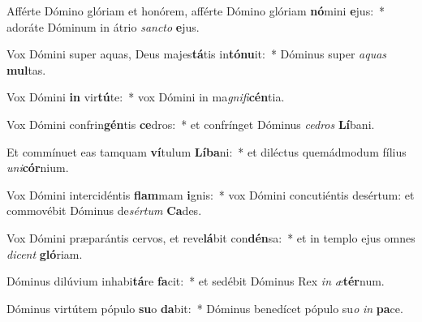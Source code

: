 \item Afférte Dómino glóriam et honórem, afférte Dómino glóriam \textbf{nó}mini \textbf{e}jus:~* adoráte Dóminum in átrio \textit{sanc}\textit{to} \textbf{e}jus.
\item Vox Dómini super aquas, Deus majes\textbf{tá}tis in\textbf{tó}\textbf{nu}it:~* Dóminus super \textit{a}\textit{quas} \textbf{mul}tas.
\item Vox Dómini \textbf{in} vir\textbf{tú}te:~* vox Dómini in ma\textit{gni}\textit{fi}\textbf{cén}tia.
\item Vox Dómini confrin\textbf{gén}tis \textbf{ce}dros:~* et confrínget Dóminus \textit{ce}\textit{dros} \textbf{Lí}bani.
\item Et commínuet eas tamquam \textbf{ví}tulum \textbf{Lí}\textbf{ba}ni:~* et diléctus quemádmodum fílius \textit{u}\textit{ni}\textbf{cór}nium.
\item Vox Dómini intercidéntis \textbf{flam}mam \textbf{i}gnis:~* vox Dómini concutiéntis desértum: et commovébit Dóminus de\textit{sér}\textit{tum} \textbf{Ca}des.
\item Vox Dómini præparántis cervos, et reve\textbf{lá}bit con\textbf{dén}sa:~* et in templo ejus omnes \textit{di}\textit{cent} \textbf{gló}riam.
\item Dóminus dilúvium inhabi\textbf{tá}re \textbf{fa}cit:~* et sedébit Dóminus Rex \textit{in} \textit{æ}\textbf{tér}num.
\item Dóminus virtútem pópulo \textbf{su}o \textbf{da}bit:~* Dóminus benedícet pópulo su\textit{o} \textit{in} \textbf{pa}ce.
